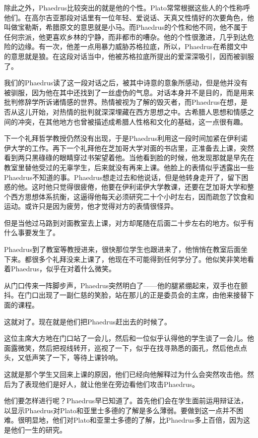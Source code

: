 \documentclass[UTF8]{article}
\begin{document}
\par 除此之外，Phaedrus比较突出的就是他的个性。Plato常常根据这些人的个性称呼他们。在高尔吉亚那段对话里有一位年轻、爱说话、天真又性情好的次要角色，他叫做宝勒斯，希腊原文的意思就是小马。而Phaedrus的个性和他不同，他不属于任何宗派，他更喜欢乡林的宁静，而非都市的嘈杂。他的个性很激进，几乎到达危险的边缘。有一次，他差一点用暴力威胁苏格拉底，所以，Phaedrus在希腊文中的意思就是狼。在这段对话当中，他被苏格拉底所提出的爱深深吸引，因而被驯服了。
\par 我们的Phaedrus读了这一段对话之后，被其中诗意的意象所感动，但是他并没有被驯服，因为他在其中还找到了一丝虚伪的气息。对话本身并不是目的，而是用来批判修辞学所诉诸情感的世界。热情被视为了解的毁灭者，而Phaedrus在想，是否从这儿开始，对热情的批判就深深埋藏在西方思想之中。古希腊人思想和情感之间的冲突，在其他地方也曾被描述成希腊人性格和文化的基础，这一点很有趣。
\par 下一个礼拜哲学教授仍然没有出现，于是Phaedrus利用这一段时间加紧在伊利诺伊大学的工作。再下一个礼拜他在芝加哥大学对面的书店里，正准备去上课，突然看到两只黑碌碌的眼睛穿过书架望着他。当他看到脸的时候，他发现那就是早先在教室里替他受过的无辜学生，后来就没有再来上课。他脸上的表情似乎透露出一些Phaedrus不知道的事。Phaedrus想走过去和他说话，但是他转身走开了，留下困惑的他。这时他只觉得很疲倦，他要在伊利诺伊大学教课，还要在芝加哥大学和整个西方思想体系抗衡，这逼得他每天必须研究二十个小时左右，因而疏忽了饮食和运动。或许只是因为疲劳，他才觉得对方的表情很怪异。
\par 但是当他过马路到对面教室去上课，对方却尾随在后面二十步左右的地方。似乎有什么事要发生了。
\par Phaedrus到了教室等教授进来，很快那位学生也跟进来了，他悄悄在教室后面坐下来。都很多个礼拜没来上课了，他现在不可能得到任何学分了。他似笑非笑地看着Phaedrus，似乎在对着什么微笑。
\par 从门口传来一阵脚步声，Phaedrus突然明白了——他的腿紧绷起来，双手也在颤抖。在门口出现了一副仁慈的笑脸，站在那儿的正是委员会的主席，由他来接替下面的课程。
\par 这就对了。现在就是他们把Phaedrus赶出去的时候了。
\par 这位主席大方地在门口站了一会儿，然后和一位似乎认得他的学生谈了一会儿。他面露微笑，然后把视线转开，巡视了一下，似乎在找寻熟悉的面孔，然后他点点头，又低声笑了一下，等待上课铃响。
\par 这就是那个学生又回来上课的原因，他们已经向他解释过为什么会突然攻击他。然后为了表现他们是好人，就让他坐在旁边看他们攻击Phaedrus。
\par 他们要怎样进行呢？Phaedrus早已知道了。首先他们会在学生面前运用辩证法，以显示Phaedrus对Plato和亚里士多德的了解是多么薄弱。要做到这一点并不困难。很明显地，他们对Plato和亚里士多德的了解，比Phaedrus多上百倍，因为这是他们一生的研究。
\end{document}
